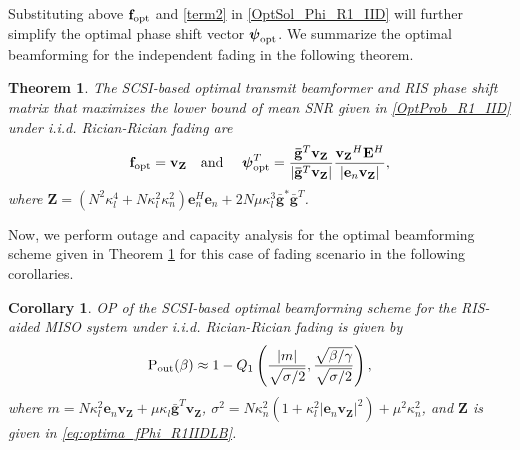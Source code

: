 \documentclass[journal,draftclsnofoot,onecolumn,12pt]{IEEEtran}
\newtheorem{theorem}{Theorem}
\newtheorem{corollary}{Corollary}[theorem]
\begin{document}
Substituting above $\mathbf{f}_{\rm opt}$ and \eqref{term2} in \eqref{OptSol_Phi_R1_IID} will further simplify the optimal phase shift vector $\boldsymbol{\psi}_{\rm opt}$.
We summarize the optimal beamforming for the independent fading in the following theorem.
\vspace{-0.3cm}
\begin{theorem}\label{Theo2}
    The SCSI-based optimal transmit beamformer and RIS phase shift matrix that maximizes the lower bound of mean SNR given in \eqref{OptProb_R1_IID} under {\rm i.i.d.} Rician-Rician fading are
    \begin{align}
    \mathbf{f}_{\rm opt}=\mathbf{v_Z}\text{~~~and~~~~} {\boldsymbol{\psi}}_{\rm opt}^T= \frac{\mathbf{\bar{g}}^T \mathbf{v_Z}}{|\mathbf{\bar{g}}^T \mathbf{v_Z}|}\frac{\mathbf{v_Z}^H\mathbf{E}^H}{|\mathbf{e}_n \mathbf{v_Z}|},\label{eq:optima_fPhi_R1IIDLB}
    \end{align}
    where $\mathbf{Z}=(N^2\kappa_l^4+N\kappa_l^2\kappa_n^2)\mathbf{e}_n^H\mathbf{e}_n + 2N\mu\kappa_l^3 \bar{\mathbf{g}}^*\bar{\mathbf{g}}^T$.
\end{theorem}
Now, we perform outage and capacity analysis for the optimal beamforming scheme given in Theorem \ref{Theo2} for this case of fading scenario in the following corollaries.
\vspace{-0.3cm}
\begin{corollary}
\label{cor:outage_R1IID}
    OP of the SCSI-based optimal beamforming scheme for the RIS-aided MISO system under {\rm i.i.d.} Rician-Rician fading is given by
    \begin{align}
        {\rm P_{out}}(\beta) \approx 1-Q_1\left(\frac{|m|}{\sqrt{\sigma/2}},\frac{\sqrt{{\beta}/{\gamma}}}{\sqrt{\sigma/2}}\right),\label{Pout_R1_IID}
    \end{align}
   where $m=N\kappa_l^2\mathbf{e}_n\mathbf{v_Z}+ \mu\kappa_l\bar{\mathbf{g}}^T\mathbf{v_Z}$,  $\sigma^2= N\kappa_n^2(1+\kappa_l^2|\mathbf{e}_n\mathbf{v_Z}|^2)+\mu^2\kappa_n^2$,
    and $\mathbf{Z}$ is given in  \eqref{eq:optima_fPhi_R1IIDLB}.
\end{corollary}
\end{document}
